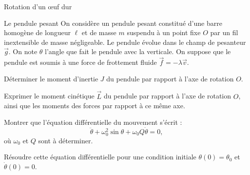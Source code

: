 \begin{exo}[PCSI][1][colle]{Rotation d'un œuf dur}
\begin{quest}

\end{quest}
\end{exo}


\begin{exo}[PC][1][colle]{Le pendule pesant}
On considère un pendule pesant constitué d’une barre homogène de longueur $\ell$ et de masse $m$ suspendu à un point fixe $O$ par un fil inextensible de masse négligeable. Le pendule évolue dans le champ de pesanteur $\Vec{g}$. On note $\theta$ l'angle que fait le pendule avec la verticale. On suppose que le pendule est soumis à une force de frottement fluide $\Vec{f} = -\lambda \Vec{v}$.
\begin{quest}
	\item Déterminer le moment d’inertie $J$ du pendule par rapport à l’axe de rotation $O$.
	\item Exprimer le moment cinétique $\Vec{L}$ du pendule par rapport à l’axe de rotation $O$, ainsi que les moments des forces par rapport à ce même axe.
	\item Montrer que l'équation différentielle du mouvement s'écrit :
	\[
	\ddot{\theta}+\omega_0^2 \sin\theta+\omega_0 Q \dot{\theta}= 0,
	\]
	où $\omega_0$ et $Q$ sont à déterminer.
	\item Résoudre cette équation différentielle pour une condition initiale $\theta(0)=\theta_0$ et $\dot{\theta}(0)=0$.
	
\end{quest}
	
\end{exo}
